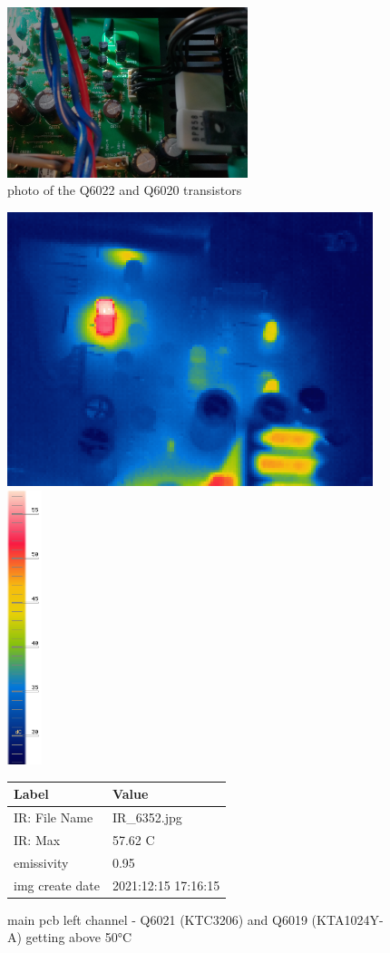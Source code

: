 \documentclass[a4paper,twoside,notitlepage]{article}
\begin{document}
\begin{figure}[hptb!]
 \centering
 \includegraphics[width=7cm, keepaspectratio=true]{img_report/main_pcb_r.png}
 \caption{photo of the Q6022 and Q6020 transistors}
\end{figure}



\begin{figure}[hptb!]
 \centering
 \includegraphics[height=8cm, keepaspectratio=true]{img_report/IR_6352}
 \includegraphics[height=8cm, keepaspectratio=true]{img_report/IR_6352_scale}

 \vspace*{5mm}
 \begin{tabular}{ l | l }
  Label & Value \\ \hline
  IR: File Name & IR\_6352.jpg \\
  IR: Max & 57.62 C \\
  emissivity & 0.95 \\
  img create date & 2021:12:15 17:16:15
 \end{tabular}
 \caption{main pcb left channel - Q6021 (KTC3206) and Q6019 (KTA1024Y-A) getting above 50\si{\celsius}}
 \label{tab:main-pcb-l-ir}
\end{figure}
\end{document}
